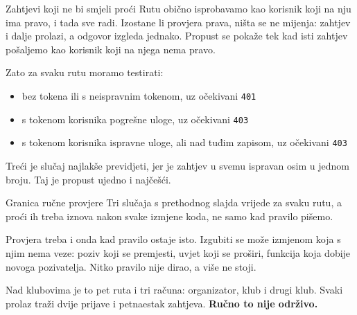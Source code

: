 \begin{frame}{Zahtjevi koji ne bi smjeli proći}
Rutu obično isprobavamo kao korisnik koji na nju ima pravo, i tada sve radi. Izostane li provjera prava, ništa se ne mijenja: zahtjev i dalje prolazi, a odgovor izgleda jednako. Propust se pokaže tek kad isti zahtjev pošaljemo kao korisnik koji na njega nema pravo.

\vspace{0.5em}
Zato za svaku rutu moramo testirati:

\begin{itemize}
  \item bez tokena ili s neispravnim tokenom, uz očekivani \texttt{401}
  \item s tokenom korisnika pogrešne uloge, uz očekivani \texttt{403}
  \item s tokenom korisnika ispravne uloge, ali nad tuđim zapisom, uz očekivani \texttt{403}
\end{itemize}

\vspace{0.5em}
Treći je slučaj najlakše previdjeti, jer je zahtjev u svemu ispravan osim u jednom broju. Taj je propust ujedno i najčešći.
\end{frame}


\begin{frame}{Granica ručne provjere}
Tri slučaja s prethodnog slajda vrijede za svaku rutu, a proći ih treba iznova nakon svake izmjene koda, ne samo kad pravilo pišemo.

\vspace{1.1em}
Provjera treba i onda kad pravilo ostaje isto. Izgubiti se može izmjenom koja s njim nema veze: poziv koji se premjesti, uvjet koji se proširi, funkcija koja dobije novoga pozivatelja. Nitko pravilo nije dirao, a više ne stoji.

\vspace{1.1em}
Nad klubovima je to pet ruta i tri računa: organizator, klub i drugi klub. Svaki prolaz traži dvije prijave i petnaestak zahtjeva. \textbf{Ručno to nije održivo.}
\end{frame}

